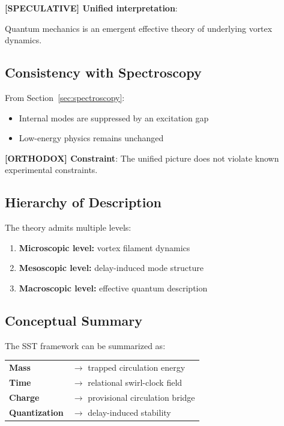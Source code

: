 \documentclass[11pt]{article}
\theoremstyle{definition}
\theoremstyle{plain}
\theoremstyle{remark}
\begin{document}
        \textbf{[SPECULATIVE] Unified interpretation}:
        \begin{center}
            Quantum mechanics is an emergent effective theory of underlying vortex dynamics.
        \end{center}
    
    \subsection{Consistency with Spectroscopy}
        
        From Section~\ref{sec:spectroscopy}:
        
        \begin{itemize}
            \item Internal modes are suppressed by an excitation gap
            \item Low-energy physics remains unchanged
        \end{itemize}
        
        \textbf{[ORTHODOX] Constraint}:
        The unified picture does not violate known experimental constraints.
    
    \subsection{Hierarchy of Description}
        
        The theory admits multiple levels:
        
        \begin{enumerate}
            \item \textbf{Microscopic level:} vortex filament dynamics
            \item \textbf{Mesoscopic level:} delay-induced mode structure
            \item \textbf{Macroscopic level:} effective quantum description
        \end{enumerate}
    
    \subsection{Conceptual Summary}
        
        The SST framework can be summarized as:
        
        \begin{center}
            \begin{tabular}{ll}
                \textbf{Mass} & $\rightarrow$ trapped circulation energy \\
                \textbf{Time} & $\rightarrow$ relational swirl-clock field \\
                \textbf{Charge} & $\rightarrow$ provisional circulation bridge \\
                \textbf{Quantization} & $\rightarrow$ delay-induced stability \\
            \end{tabular}
        \end{center}
    
\end{document}
